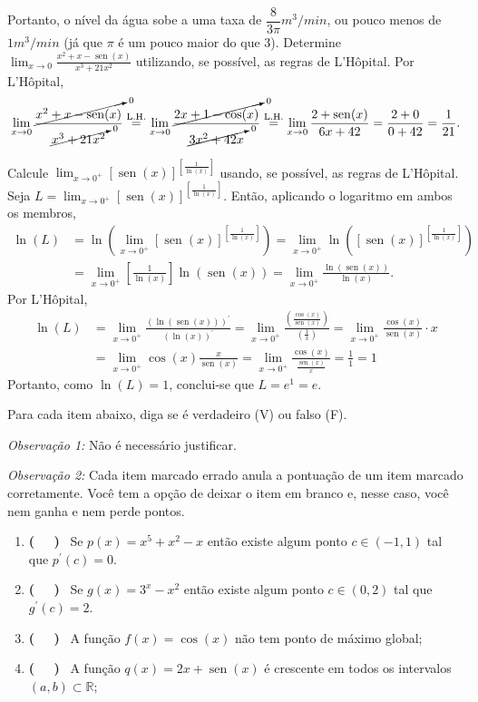 \documentclass[12pt,a4paper]{article}
\newcommand*\sen{\operatorname{sen}}
\newcommand*\R{\mathbb{R}}
\begin{document}
\begin{ExerciseList}
Portanto, o nível da água sobe a uma taxa de $\dfrac{8}{3\pi} m^3 / min$, ou pouco menos de $1 m^3 / min$ (já que $\pi$ é um pouco maior do que $3$).
\Exercise[title={2,0}] Determine $\displaystyle\lim_{x \to 0} \frac{x^2 + x - \sen(x)}{x^3 + 21x^2}$ utilizando, se possível, as regras de L'Hôpital.
\Answer Por L'Hôpital,
\[
\lim_{x \to 0} \frac{ \cancelto{0}{x^2 + x - \sen(x)} }{ \cancelto{0}{x^3 + 21x^2}}
\stackrel{\text{L.H.}}{=}\lim_{x \to 0} \frac{ \cancelto{0}{2x + 1 - \cos(x)} }{ \cancelto{0}{3x^2+42x} }
\stackrel{\text{L.H.}}{=}\lim_{x \to 0} \frac{2 + \sen(x)}{ 6x + 42}
=\frac{2 + 0}{ 0 + 42}
=\frac{1}{21}.
\]

\Exercise[title={2,0}] Calcule $\displaystyle\lim_{x\to 0^+} \left[\sen(x)\right]^{\left[\frac{1}{\ln(x)}\right]}$ usando, se possível, as regras de L'Hôpital.
\Answer Seja $L = \lim_{x\to 0^+} \left[\sen(x)\right]^{\left[\frac{1}{\ln(x)}\right]}$. Então, aplicando o logaritmo em ambos os membros,
\begin{align*}
    \ln(L)
    & = \ln\left(\lim_{x\to 0^+} \left[\sen(x)\right]^{\left[\frac{1}{\ln(x)}\right]}\right)
    = \lim_{x\to 0^+} \ln\left(\left[\sen(x)\right]^{\left[\frac{1}{\ln(x)}\right]}\right)\\
    & = \lim_{x\to 0^+} \left[\frac{1}{\ln(x)}\right] \ln\left(\sen(x)\right)
    = \lim_{x\to 0^+} \frac{\ln\left(\sen(x)\right)}{\ln(x)}.
\end{align*}
Por L'Hôpital,
\begin{align*}
    \ln(L)
    &
    = \lim_{x\to 0^+} \frac{(\ln\left(\sen(x)\right))^\prime}{(\ln(x))^\prime}
    = \lim_{x\to 0^+} \frac{\left(\frac{\cos(x)}{\sen(x)}\right)}{\left(\frac{1}{x}\right)}
    = \lim_{x\to 0^+} \frac{\cos(x)}{\sen(x)}\cdot x\\
    &
    = \lim_{x\to 0^+} \cos(x)\frac{x}{\sen(x)}
    = \lim_{x\to 0^+} \frac{\cos(x)}{\frac{\sen(x)}{x}}
    = \frac{1}{1}
    = 1
\end{align*}
Portanto, como $\ln(L) = 1$, conclui-se que $L = e^1 = e$.

\Exercise[title={2,0}] Para cada item abaixo, diga se é verdadeiro (V) ou falso (F).

\emph{Observação 1:} Não é necessário justificar.

\emph{Observação 2:} Cada item marcado errado anula a pontuação de um item marcado corretamente. Você tem a opção de deixar o item em branco e, nesse caso, você nem ganha e nem perde pontos.

\begin{enumerate}
  \item {\bf ( \ \ )} \ Se $p(x) = x^5 + x^2 - x$ então existe algum ponto $c \in (-1, 1)$ tal que $p^\prime(c) = 0$.
  \item {\bf ( \ \ )} \ Se $g(x) = 3^x - x^2$ então existe algum ponto $c \in (0, 2)$ tal que $g^\prime(c) = 2$.
  \item {\bf ( \ \ )} \ A função $f(x) = \cos(x)$ não tem ponto de máximo global;
  \item {\bf ( \ \ )} \ A função $q(x) = 2x + \sen(x)$ é crescente em todos os intervalos $(a, b) \subset \R$;
\end{enumerate}


\end{ExerciseList}
\end{document}
